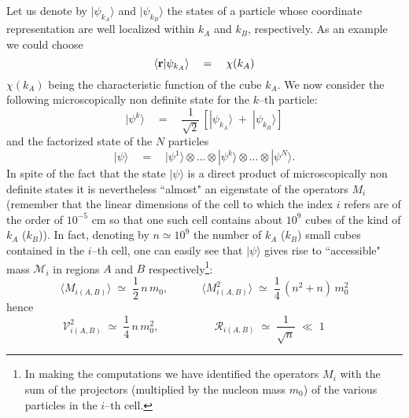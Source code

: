 \documentclass[12pt]{article}
\begin{document}
Let us denote by $|\psi_{k_{A}}\rangle$ and $|\psi_{k_{B}}\rangle$
the states of a particle whose coordinate representation are well
localized within $k_{A}$ and $k_{B}$, respectively. As an example
we could choose
\begin{equation}
\langle{\bf r}|\psi_{k_{A}}\rangle \quad = \quad \chi(k_{A})
\end{equation}
$\chi(k_{A})$  being the characteristic function of the cube $k_{A}$.
We now consider the following microscopically non definite state
for the $k$--th particle:
\begin{equation} \label{ge1}
|\psi^{k}\rangle \quad = \quad \frac{1}{\sqrt{2}}\, \left[
|\psi_{k_{A}}\rangle \; + \; |\psi_{k_{B}}\rangle \right]
\end{equation}
and the factorized state of the $N$ particles
\begin{equation} \label{ge2}
|\psi\rangle \quad  =\quad |\psi^{1}\rangle\otimes\ldots \otimes
|\psi^{k}\rangle \otimes\ldots\otimes |\psi^{N}\rangle.
\end{equation}
In spite of the fact that the state $|\psi\rangle$ is a direct
product of microscopically non definite states it is nevertheless
``almost" an eigenstate of the operators $M_{i}$ (remember that
the linear dimensions of the cell to which the index $i$ refers
are of the order of $10^{-5}$ cm so that one such cell contains
about $10^{9}$ cubes of the kind of $k_{A}$ ($k_{B}$)). In fact,
denoting by $n \simeq 10^{9}$  the number of $k_{A}$ ($k_{B}$)
small cubes contained in the $i$--th cell, one can easily see that
$|\psi\rangle$ gives rise to ``accessible" mass ${\mathcal M}_{i}$
in regions $A$ and $B$ respectively\footnote{In making the
computations we have identified the operators $M_{i}$ with the sum
of the projectors (multiplied by the nucleon mass $m_{0}$) of the
various particles in the $i$--th cell.}:
\begin{equation}
\langle M_{i(A,B)} \rangle \; \simeq \; \frac{1}{2}\, n \, m_{0},
\qquad\quad \langle M^{2}_{i(A,B)} \rangle \; \simeq \;
\frac{1}{4}\, (n^{2} + n)\, m^{2}_{0}
\end{equation}
hence
\begin{equation}
{\mathcal V}^{2}_{i(A,B)} \; \simeq \; \frac{1}{4}\, n \,
m^{2}_{0}, \qquad\quad\qquad {\mathcal R}_{i(A,B)} \; \simeq \;
\frac{1}{\sqrt{n}} \; \ll \; 1 \qquad
\end{equation}
\end{document}

